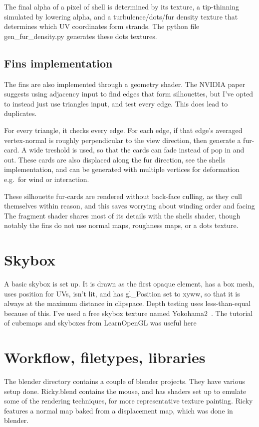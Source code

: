 \documentclass[a4paper, 12pt]{article}
\begin{document}
    The final alpha of a pixel of shell is determined by
    its texture, a tip-thinning simulated by lowering alpha,
    and a turbulence/dots/fur density texture that determines which UV coordinates form strands.
    The python file gen\_fur\_density.py generates these dots textures.

    \subsection{Fins implementation}

    The fins are also implemented through a geometry shader.
    The NVIDIA paper suggests using adjacency input to find edges that form silhouettes,
    but I've opted to instead just use triangles input,
    and test every edge.
    This does lead to duplicates.

    For every triangle, it checks every edge.
    For each edge, if that edge's averaged vertex-normal
    is roughly perpendicular to the view direction,
    then generate a fur-card.
    A wide treshold is used, so that the cards can fade instead of pop in and out.
    These cards are also displaced along the fur direction, see the shells implementation,
    and can be generated with multiple vertices for deformation e.g.\ for wind or interaction.

    These silhouette fur-cards are rendered without back-face culling,
    as they cull themselves within reason,
    and this saves worrying about winding order and facing
    The fragment shader shares most of its details with the shells shader,
    though notably the fins do not use normal maps, roughness maps, or a dots texture.

    \section{Skybox}
    A basic skybox is set up.
    It is drawn as the first opaque element,
    has a box mesh,
    uses position for UVs,
    isn't lit,
    and has gl\_Position set to xyww,
    so that it is always at the maximum distance in clipspace.
    Depth testing uses less-than-equal because of this.
    I've used a free skybox texture named Yokohama2~\cite{yokohama2}.
    The tutorial of cubemaps and skyboxes from LearnOpenGL was useful here~\cite{learncubemaps}

    \section{Workflow, filetypes, libraries}
    The blender directory contains a couple of blender projects.
    They have various setup done.
    Ricky.blend contains the mouse,
    and has shaders set up to emulate some of the rendering techniques,
    for more representative texture painting.
    Ricky features a normal map baked from a displacement map, which was done in blender.
\end{document}
